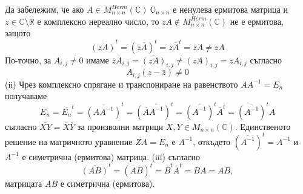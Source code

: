 \documentclass{article}
\newcommand*{\bC}{\mathbb{C}}
\newcommand*{\bR}{\mathbb{R}}
\newcommand*{\mat}[2]{M_{{#1}\times {#2}}}
\begin{document}
Да забележим, че ако $A \in M^{Herm}_{n\times n}(\mathbb{C})\ {\mathbb{O}_{n\times n}}$ е
ненулева ермитова матрица и $z \in \bC \setminus \bR$ е комплексно нереално число, то
$zA \notin M^{Herm}_{n\times n}(\mathbb{C})$ не е ермитова, защото
\[
    \overline{(zA)}^t=(\overline{z}\overline{A})^t=\overline{z}\overline{A}^t=\overline{z}A\neq zA
\]
По-точно, за $A_{i,j}\neq 0$ имаме $\overline{z}A_{i,j}=\overline{(zA)}_{i,j}\neq (zA)_{i,j}=zA_{i,j}$
съгласно
\[
    A_{i,j}(z-\overline{z})\neq 0
\]
(ii) Чрез комплексно спрягане и транспониране на равенството $AA^{-1} = E_n$
получаваме
\[
    E_n = \overline{E_n}^t = \overline{(AA^{-1})}^t =(\overline{A}\overline{A^{-1}})^t=
    (\overline{A^{-1}})^t\overline{A}^t=(\overline{A^{-1}})^tA
\]
съгласно $\overline{XY}=\overline{X}\overline{Y}$ за произволни матрици $X,Y\in\mat{n}{n}(\bC)$.
Единственото решение на матричното уравнение $ZA=E_n$ е $A^{-1}$, откъдето $(\overline{A^{-1}})^t=A^{-1}$
и $A^{-1}$ е симетрична (ермитова) матрица.
(iii) съгласно
\[
    \overline{(AB)}^t=(\overline{A}\overline{B})^t=\overline{B}^t\overline{A}^t=BA=AB,
\]
матрицата $AB$ е симетрична (ермитова).
\end{document}
